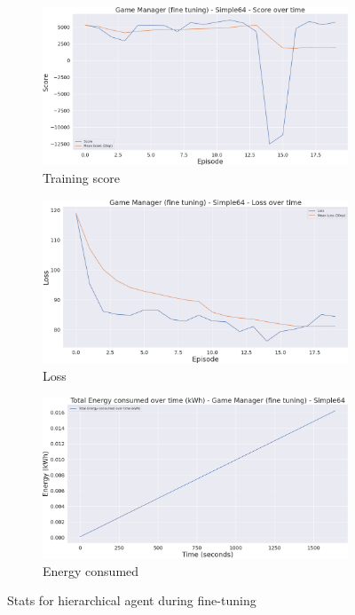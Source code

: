 \begin{figure}[h]
    \centering
    \begin{subfigure}[b]{0.495\textwidth}
        \includegraphics[width=1\textwidth]{figs/multi_dqn_game_manager_fine_tune/score.png}
        \caption{Training score}
    \end{subfigure}
    \begin{subfigure}[b]{0.495\textwidth}
        \includegraphics[width=1\textwidth]{figs/multi_dqn_game_manager_fine_tune/loss.png}
        \caption{Loss}
    \end{subfigure}
    \begin{subfigure}[b]{0.495\textwidth}
        \includegraphics[width=1\textwidth]{figs/multi_dqn_game_manager_fine_tune/energy_consumed.png}
        \caption{Energy consumed}
    \end{subfigure}
    \caption{Stats for hierarchical agent during fine-tuning}
\end{figure}

